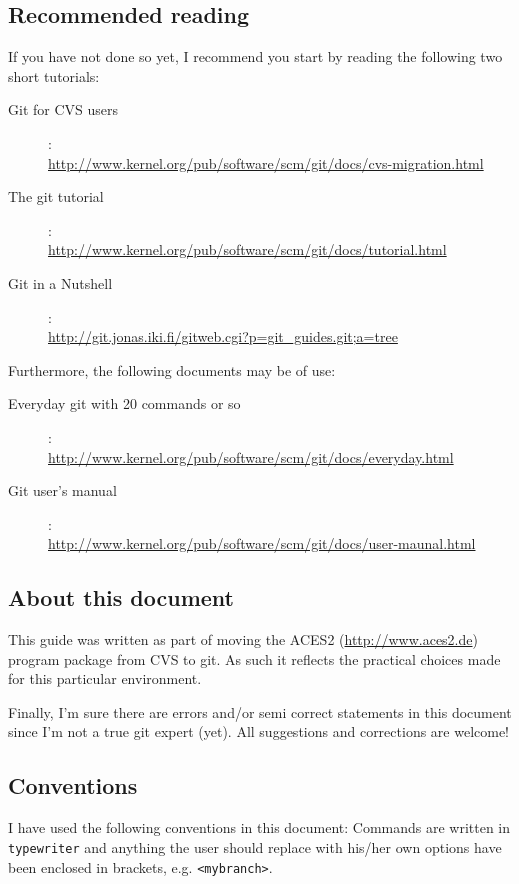 \documentclass[a4paper,10pt]{article}
\begin{document}
\subsection{Recommended reading}
If you have not done so yet, I
recommend you start by reading the following two short tutorials:
\begin{description}
\item[Git for CVS users]:\\
\url{http://www.kernel.org/pub/software/scm/git/docs/cvs-migration.html}
\item[The git tutorial]:\\
\url{http://www.kernel.org/pub/software/scm/git/docs/tutorial.html}
\item[Git in a Nutshell]:\\
  \url{http://git.jonas.iki.fi/gitweb.cgi?p=git_guides.git;a=tree}
\end{description}
Furthermore, the following documents may be of use:
\begin{description}
\item[Everyday git with 20 commands or so]:\\
\url{http://www.kernel.org/pub/software/scm/git/docs/everyday.html}
\item[Git user's manual]:\\
\url{http://www.kernel.org/pub/software/scm/git/docs/user-maunal.html}
\end{description}

\subsection{About this document}
This guide was written as part of moving the ACES2 (\url{http://www.aces2.de})
program package from CVS to git. As such it reflects the 
practical choices made for this particular environment. 

Finally, I'm sure there are errors and/or semi correct statements in this
document since I'm not a true git expert (yet). All suggestions and
corrections are welcome!

\subsection{Conventions}
I have used the following conventions in this document: Commands are written 
in {\tt typewriter} and anything the user should replace with his/her own 
options have been enclosed in brackets, e.g. {\tt <mybranch>}.  
\end{document}
